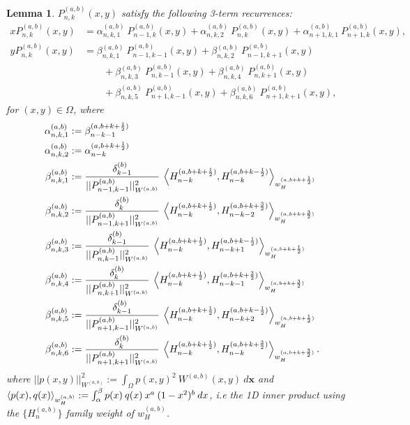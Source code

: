 \documentclass[11pt, oneside]{article}   	%
\newcommand{\half}{\frac{1}{2}}
\newcommand{\Pnk}{P_{n,k}}
\newcommand{\Wab}{{W^{(a,b)}}}
\newcommand{\alphaab}{\alpha^{(a,b)}}
\newcommand{\betaab}{\beta^{(a,b)}}
\newtheorem{lemma}{Lemma}
\begin{document}
\begin{lemma}
$\Pnk^{(a,b)}(x,y)$ satisfy the following 3-term recurrences:
\begin{align}
x \Pnk^{(a,b)}(x,y) &= \alphaab_{n,k,1} \: P_{n-1, k}^{(a,b)}(x, y) + \alphaab_{n,k,2} \: P_{n, k}^{(a,b)}(x, y) + \alphaab_{n+1,k,1} \: P_{n+1, k}^{(a,b)}(x, y), \\
y \Pnk^{(a,b)}(x,y) &= \betaab_{n,k,1} \: P_{n-1, k-1}^{(a,b)}(x, y) + \betaab_{n,k,2} \: P_{n-1, k+1}^{(a,b)}(x, y) \nonumber \\
		& \quad \quad + \betaab_{n,k,3} \: P_{n, k-1}^{(a,b)}(x, y) + \betaab_{n,k,4} \: P_{n, k+1}^{(a,b)}(x, y) \nonumber \\
		& \quad \quad + \betaab_{n,k,5} \: P_{n+1, k-1}^{(a,b)}(x, y) + \betaab_{n,k,6} \: P_{n+1, k+1}^{(a,b)}(x, y),
\end{align}
for \((x,y) \in \Omega\), where
\begin{align}
\alphaab_{n,k,1} &:= \beta_{n-k-1}^{(a, b+k+\half)} \\
\alphaab_{n,k,2} &:= \alpha_{n-k}^{(a, b+k+\half)} \\
\betaab_{n,k,1} &:= \frac{\delta_{k-1}^{(b)}}{|| P_{n-1,k-1}^{(a,b)} ||_{W^{(a,b)}}^2} \: \ip<H_{n-k}^{(a, b+k+\half)}, H_{n-k}^{(a, b+k-\half)}>_{w_H^{(a, b+k+\half)}} \\
\betaab_{n,k,2} &:= \frac{\delta_{k}^{(b)}}{|| P_{n-1,k+1}^{(a,b)} ||_{W^{(a,b)}}^2} \: \ip<H_{n-k}^{(a, b+k+\half)}, H_{n-k-2}^{(a, b+k+\frac{3}{2})}>_{w_H^{(a, b+k+\frac{3}{2})}} \\
\betaab_{n,k,3} &:= \frac{\delta_{k-1}^{(b)}}{|| P_{n,k-1}^{(a,b)} ||_{W^{(a,b)}}^2} \: \ip<H_{n-k}^{(a, b+k+\half)}, H_{n-k+1}^{(a, b+k-\half)}>_{w_H^{(a, b+k+\half)}} \\
\betaab_{n,k,4} &:= \frac{\delta_{k}^{(b)}}{|| P_{n,k+1}^{(a,b)} ||_{W^{(a,b)}}^2} \: \ip<H_{n-k}^{(a, b+k+\half)}, H_{n-k-1}^{(a, b+k+\frac{3}{2})}>_{w_H^{(a, b+k+\frac{3}{2})}} \\
\betaab_{n,k,5} &:= \frac{\delta_{k-1}^{(b)}}{|| P_{n+1,k-1}^{(a,b)} ||_{W^{(a,b)}}^2} \: \ip<H_{n-k}^{(a, b+k+\half)}, H_{n-k+2}^{(a, b+k-\half)}>_{w_H^{(a, b+k+\half)}} \\
\betaab_{n,k,6} &:= \frac{\delta_{k}^{(b)}}{|| P_{n+1,k+1}^{(a,b)} ||_{W^{(a,b)}}^2} \: \ip<H_{n-k}^{(a, b+k+\half)}, H_{n-k}^{(a, b+k+\frac{3}{2})}>_{w_H^{(a, b+k+\frac{3}{2})}}. 
\end{align}
where $|| p(x,y) ||_{W^{(a,b)}}^2 := \int_\Omega p(x,y)^2 \: \Wab(x,y) \: d\mathbf{x}$ and $\ip<p(x), q(x)>_{w_H^{(a, b)}} := \int_\alpha^\beta p(x) \: q(x) \: x^a \: (1-x^2)^b \: dx$, i.e the 1D inner product using the $\{H^{(a,b)}_n\}$ family weight of $w_H^{(a, b)}$.

\end{lemma}
\end{document}
